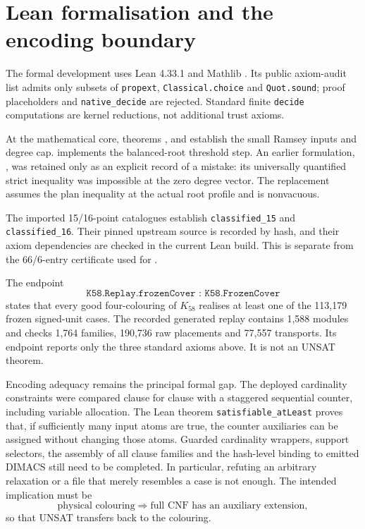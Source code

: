 \documentclass[11pt]{article}
\theoremstyle{definition}
\theoremstyle{remark}
\begin{document}
\section{Lean formalisation and the encoding boundary}\label{sec:formal}

The formal development uses Lean 4.33.1 and Mathlib \cite{Lean2021,Mathlib2020}.
Its public axiom-audit list admits only subsets of
\texttt{propext}, \texttt{Classical.choice} and \texttt{Quot.sound}; proof
placeholders and \texttt{native\_decide} are rejected.  Standard finite
\texttt{decide} computations are kernel reductions, not additional trust
axioms.

At the mathematical core, theorems ,
 and  establish the
small Ramsey inputs and degree cap.   implements the
balanced-root threshold step.  An earlier formulation,
, was retained only as an explicit record of a
mistake: its universally quantified strict inequality was impossible at the
zero degree vector.  The replacement assumes the plan inequality at the actual
root profile and is nonvacuous.

The imported 15/16-point catalogues establish \texttt{classified\_15} and
\texttt{classified\_16}.  Their pinned upstream source is recorded by hash,
and their axiom dependencies are checked in the current Lean build.  This is
separate from the 66/6-entry certificate used for .

The endpoint
\[
\texttt{K58.Replay.frozenCover : K58.FrozenCover}
\]
states that every good four-colouring of $K_{58}$ realises at least one of the
113,179 frozen signed-unit cases.  The recorded generated replay contains
1,588 modules and checks 1,764 families, 190,736 raw placements and 77,557
transports.  Its endpoint reports only the three standard axioms above.  It is
not an UNSAT theorem.

Encoding adequacy remains the principal formal gap.  The deployed cardinality
constraints were compared clause for clause with a staggered sequential
counter, including variable allocation.  The Lean theorem
\texttt{satisfiable\_atLeast} proves that, if sufficiently many input atoms
are true, the counter auxiliaries can be assigned without changing those
atoms.  Guarded cardinality wrappers, support selectors, the assembly of all
clause families and the hash-level binding to emitted DIMACS still need to be
completed.  In particular, refuting an arbitrary relaxation or a file that
merely resembles a case is not enough.  The intended implication must be
\[
 \text{physical colouring}\Longrightarrow
 \text{full CNF has an auxiliary extension},
\]
so that UNSAT transfers back to the colouring.
\end{document}
